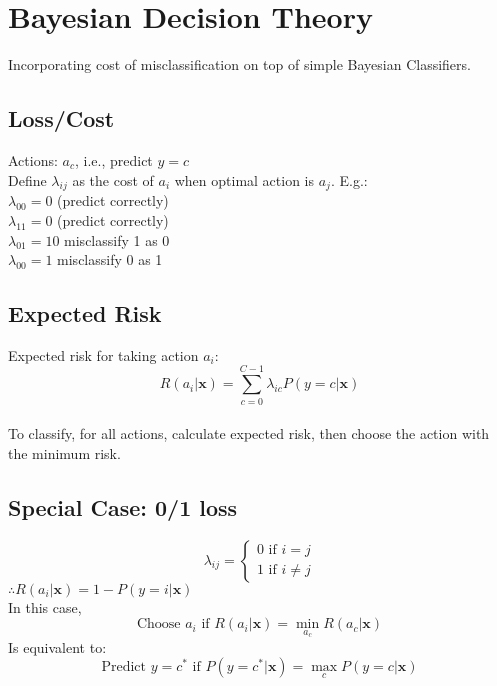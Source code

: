 \section{Bayesian Decision Theory}
Incorporating cost of misclassification on top of simple Bayesian Classifiers.
\subsection*{Loss/Cost}
Actions: $a_c$, i.e., predict $y=c$\\
Define $\lambda_{ij}$ as the cost of $a_i$ when optimal action is $a_j$. E.g.:\\
$\lambda_{00} = 0$ (predict correctly)\\
$\lambda_{11} = 0$ (predict correctly)\\
$\lambda_{01} = 10$ misclassify 1 as 0\\
$\lambda_{00} = 1$ misclassify 0 as 1\\
\subsection*{Expected Risk}
Expected risk for taking action $a_i$:\\
\[R(a_i|\mathbf{x}) = \sum^{C-1}_{c=0}\lambda_{ic}P(y=c|\mathbf{x})\]\\
To classify, for all actions, calculate expected risk, then choose the action 
with the minimum risk.
\subsection*{Special Case: 0/1 loss}
\[\lambda_{ij} = \begin{cases}
    0 \text{ if } i = j \\
    1 \text{ if } i \neq j
\end{cases}\]
$\therefore R(a_i|\mathbf{x}) = 1 - P(y=i|\mathbf{x})$\\
In this case,\\
\[\text{Choose } a_i \text{ if } R(a_i|\mathbf{x}) = \min_{a_c}R(a_c|\mathbf{x})\]
Is equivalent to:\\
\[\text{Predict } y = c^* \text{ if } P(y=c^*|\mathbf{x}) = \max_{c}P(y=c|\mathbf{x})\]

